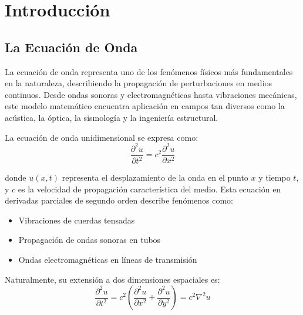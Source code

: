 \documentclass[a4paper]{article}
\begin{document}


\maketitle

\tableofcontents
\newpage

\section{Introducción}

\subsection{La Ecuación de Onda}

La ecuación de onda representa uno de los fenómenos físicos más fundamentales en la naturaleza, describiendo la propagación de
perturbaciones en medios continuos. Desde ondas sonoras y electromagnéticas hasta vibraciones mecánicas, este modelo matemático
encuentra aplicación en campos tan diversos como la acústica, la óptica, la sismología y la ingeniería estructural.

La ecuación de onda unidimensional se expresa como:
\begin{equation}
    \frac{\partial^2 u}{\partial t^2} = c^2 \frac{\partial^2 u}{\partial x^2}
\end{equation}

donde $u(x,t)$ representa el desplazamiento de la onda en el punto $x$ y tiempo $t$, y $c$ es la velocidad de propagación característica del medio. Esta ecuación en derivadas parciales de segundo orden describe fenómenos como:

\begin{itemize}
    \item Vibraciones de cuerdas tensadas
    \item Propagación de ondas sonoras en tubos
    \item Ondas electromagnéticas en líneas de transmisión
\end{itemize}

Naturalmente, su extensión a dos dimensiones espaciales es:
\begin{equation}
    \frac{\partial^2 u}{\partial t^2} = c^2 \left(\frac{\partial^2 u}{\partial x^2} + \frac{\partial^2 u}{\partial y^2}\right) = c^2 \nabla^2 u
\end{equation}
\end{document}
